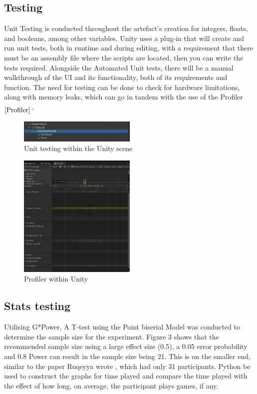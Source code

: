 \documentclass[conference]{IEEEtran}
\begin{document}
\subsection{Testing}
Unit Testing is conducted throughout the artefact’s creation for integers, floats, and booleans, among other variables. Unity uses a plug-in that will create and run unit tests, both in runtime and during editing, with a requirement that there must be an assembly file where the scripts are located, then you can write the tests required. Alongside the Automated Unit tests, there will be a manual walkthrough of the UI and its functionality, both of its requirements and function. The need for testing can be done to check for hardware limitations, along with memory leaks, which can go in tandem with the use of the Profiler $_{\ref{Profiler}}$.
\begin{figure}[H]
\begin{center}
\includegraphics[width = 0.5\textwidth, ]{Unittesting}
\caption{Unit testing within the Unity scene}
\label{figure3}
\end{center}
\end{figure}

\begin{figure}[H]
\begin{center}
\includegraphics[width = 0.5\textwidth, ]{Profiler}
\caption{Profiler within Unity}
\label{Profiler}
\end{center}
\end{figure}

\subsection{Stats testing}
Utilising G*Power, A T-test using the Point biserial Model was conducted to determine the sample size for the experiment. Figure 3 shows that the recommended sample size using a large effect size (0.5), a 0.05 error probability and 0.8 Power can result in the sample size being 21. This is on the smaller end, similar to the paper Ruqeyya wrote \cite{Ruqeyya2022}, which had only 31 participants. Python be used to construct the graphs for time played and compare the time played with the effect of how long, on average, the participant plays games, if any.\\
\end{document}
